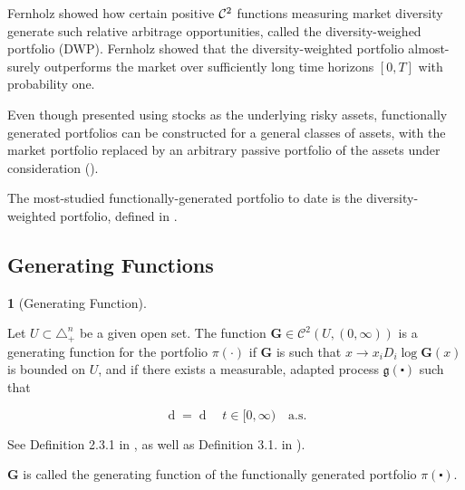 \documentclass[british]{amsart}
\numberwithin{equation}{section}
\numberwithin{figure}{section}
\theoremstyle{plain}
\theoremstyle{definition}
\newtheorem{defn}[thm]{\protect\definitionname}
\theoremstyle{plain}
\theoremstyle{plain}
\theoremstyle{plain}
\theoremstyle{remark}
\theoremstyle{plain}
\providecommand{\definitionname}{Definition}
\renewcommand{\d}[1]{\mathop{\mathrm{d}{#1}}}
\newcommand{\ranget}{t\in[0,\infty)}
\newcommand{\almostsurely}{\text{a.s.}}
\begin{document}

Fernholz \cite{fernholz1999diversity} showed how certain positive $\mathcal{C}^2$ functions measuring market diversity generate such relative arbitrage opportunities, called the diversity-weighed portfolio (DWP). Fernholz \cite{fernholz2005} showed that the diversity-weighted portfolio almost-surely outperforms the market over sufficiently long time horizons $[0, T]$ with probability one. 

 


Even though presented using stocks as the underlying risky assets, functionally generated portfolios can be constructed for a general classes of assets, with the market portfolio replaced by an arbitrary passive portfolio of the assets under consideration (\cite{fernholz2009}).

The most-studied functionally-generated portfolio to date is the diversity-weighted portfolio, defined in \cite{fernholz2005}. 

\subsection{Generating Functions}

\begin{defn} [Generating Function]
	\label{def:generatingfunction}

	Let $U\subset\triangle_{+}^{n}$ be a given open set. The function $\mathbf{G}\in\mathcal{C}^{2}(U,(0,\infty))$ is a generating function for the portfolio $\pi(\cdot)$ if $\mathbf{G}$ is such that $x\to x_{i}D_{i}\log\mathbf{G}(x)$ is bounded on $U$, and if there exists a measurable, adapted process $\mathfrak{g}(\centerdot)$ such that 

	\begin{equation}
		\d{ \log \left( \frac{V^{\pi}(t)}{V^{\mu}(t)} \right) } = 
		\d{ \log \mathbf{G}(\mu(t)) + \mathfrak{g}(t) }
		\quad \ranget
		\quad \almostsurely
	\end{equation}

See Definition 2.3.1 in \cite{vervuurt2015}, as well as Definition 3.1. in \cite{karatzas1998}). 

$\mathbf{G}$ is called the generating function of the functionally generated portfolio $\pi(\centerdot)$.

\end{defn}
\end{document}
